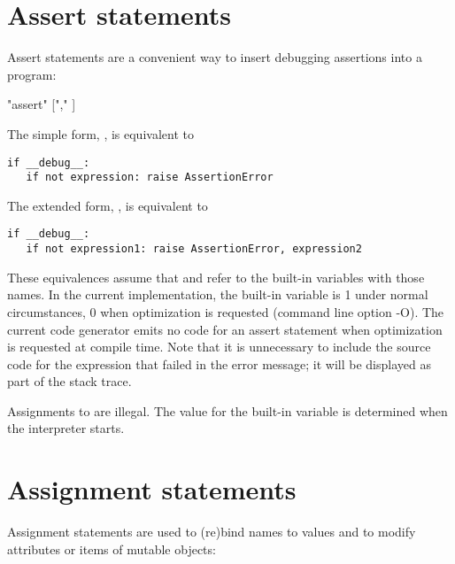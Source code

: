 \section{Assert statements \label{assert}}

Assert statements are a convenient way to insert
debugging assertions into a program:

\begin{productionlist}
             {"assert"  ["," ]}
\end{productionlist}

The simple form, , is equivalent to

\begin{verbatim}
if __debug__:
   if not expression: raise AssertionError
\end{verbatim}

The extended form, , is
equivalent to

\begin{verbatim}
if __debug__:
   if not expression1: raise AssertionError, expression2
\end{verbatim}

These equivalences assume that  and
 refer to the built-in
variables with those names.  In the current implementation, the
built-in variable  is 1 under normal circumstances, 0
when optimization is requested (command line option -O).  The current
code generator emits no code for an assert statement when optimization
is requested at compile time.  Note that it is unnecessary to include
the source code for the expression that failed in the error message;
it will be displayed as part of the stack trace.

Assignments to  are illegal.  The value for the
built-in variable is determined when the interpreter starts.


\section{Assignment statements \label{assignment}}

Assignment statements are used to
(re)bind names to values and to modify attributes or items of mutable
objects:

